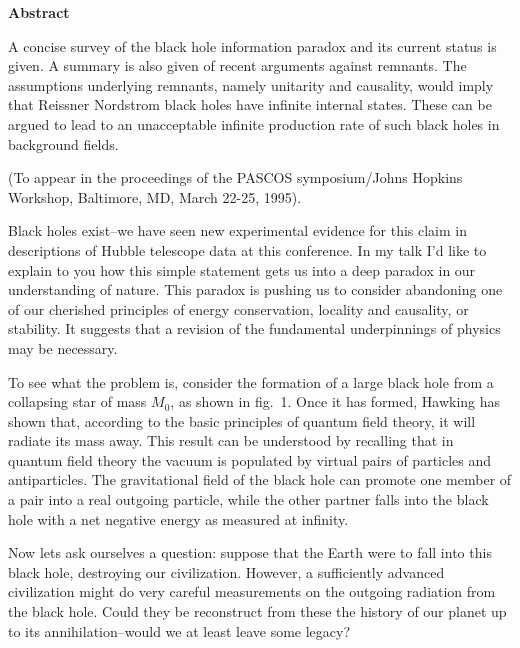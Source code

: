\bigskip
\centerline{\bf Abstract}

A concise survey of the black hole information paradox and its current
status is given. A
summary is also given of recent arguments against remnants. The
assumptions underlying remnants, namely unitarity
and causality, would imply that Reissner Nordstrom black holes have
infinite internal states.  These can be argued to lead to an unacceptable
infinite production rate of such black holes in background fields.

(To appear in the proceedings of the PASCOS
symposium/Johns Hopkins Workshop, Baltimore, MD, March 22-25, 1995).

\Date{}

Black holes exist--we have seen new experimental evidence for this
claim in descriptions of Hubble telescope data at this conference.
In my talk I'd like to explain to you how this simple statement gets us
into a deep paradox in our understanding of nature. This paradox is
pushing us to consider abandoning one of our cherished principles of
energy conservation, locality and causality, or stability. It suggests
that a revision of the fundamental underpinnings of physics may be
necessary.

To see what the problem is, consider the formation of a large black hole
from a collapsing star of mass ${M_0}$,
as shown in fig.~1. Once it has
formed, Hawking  has shown that, according to the basic
principles of quantum field theory, it will radiate its mass away.  This
result can be understood by recalling that in quantum field theory the
vacuum is populated by virtual pairs of particles and antiparticles.  The
gravitational field of the black hole can promote one member of
a pair into a real outgoing particle, while the other partner falls into
the black hole with a net negative energy as measured at infinity.


Now lets ask ourselves a question: suppose that the Earth were to fall
into this black hole, destroying our civilization. However, a
sufficiently advanced civilization might do very careful measurements on
the outgoing radiation from the black hole.  Could they be
reconstruct from these the history of our planet up to its
annihilation--would we at least leave some legacy?
%

